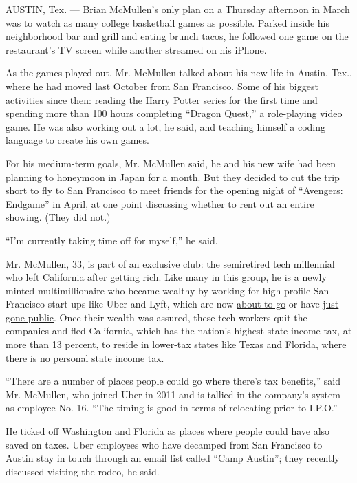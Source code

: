AUSTIN, Tex. --- Brian McMullen's only plan on a Thursday afternoon in
March was to watch as many college basketball games as possible. Parked
inside his neighborhood bar and grill and eating brunch tacos, he
followed one game on the restaurant's TV screen while another streamed
on his iPhone.

As the games played out, Mr. McMullen talked about his new life in
Austin, Tex., where he had moved last October from San Francisco. Some
of his biggest activities since then: reading the Harry Potter series
for the first time and spending more than 100 hours completing ``Dragon
Quest,'' a role-playing video game. He was also working out a lot, he
said, and teaching himself a coding language to create his own games.

For his medium-term goals, Mr. McMullen said, he and his new wife had
been planning to honeymoon in Japan for a month. But they decided to cut
the trip short to fly to San Francisco to meet friends for the opening
night of ``Avengers: Endgame'' in April, at one point discussing whether
to rent out an entire showing. (They did not.)

``I'm currently taking time off for myself,'' he said.

Mr. McMullen, 33, is part of an exclusive club: the semiretired tech
millennial who left California after getting rich. Like many in this
group, he is a newly minted multimillionaire who became wealthy by
working for high-profile San Francisco start-ups like Uber and Lyft,
which are now
\href{https://www.nytimes.com/2019/04/26/technology/uber-ipo-valuation-price-range.html?rref=collection\%2Fbyline\%2Fkate-conger\&action=click\&contentCollection=undefined\&region=stream\&module=stream_unit\&version=latest\&contentPlacement=1\&pgtype=collection}{about
to go} or have
\href{https://www.nytimes.com/2019/03/29/technology/lyft-stock-price.html}{just
gone public}. Once their wealth was assured, these tech workers quit the
companies and fled California, which has the nation's highest state
income tax, at more than 13 percent, to reside in lower-tax states like
Texas and Florida, where there is no personal state income tax.

``There are a number of places people could go where there's tax
benefits,'' said Mr. McMullen, who joined Uber in 2011 and is tallied in
the company's system as employee No. 16. ``The timing is good in terms
of relocating prior to I.P.O.''

He ticked off Washington and Florida as places where people could have
also saved on taxes. Uber employees who have decamped from San Francisco
to Austin stay in touch through an email list called ``Camp Austin'';
they recently discussed visiting the rodeo, he said.

